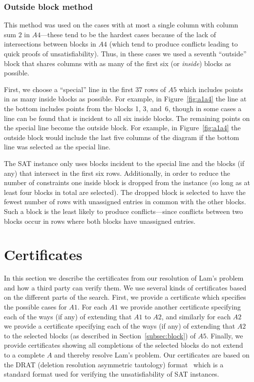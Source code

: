 \documentclass[letterpaper]{article}
\begin{document}
\subsubsection{Outside block method}

This method was used on the cases with at most a single
column with column sum $2$ in $A4$---these tend to be the hardest cases
because of the lack of intersections between blocks in $A4$ (which
tend to produce conflicts leading to quick proofs of unsatisfiability).
Thus, in these cases we used a seventh ``outside''
block that shares columns with as many of the first six (or \emph{inside}) blocks as possible.

First, we choose a ``special'' line in the first 37 rows of $A5$ which includes points
in as many inside blocks as possible.  For example, in Figure~\ref{fig:a1a4}
the line at the bottom includes points from the blocks 1, 3, and~6,
though in some cases a line can be found that is incident to all six inside blocks.
The remaining points on the special line become the outside block.
For example, in Figure~\ref{fig:a1a4} the outside block
would include the last five columns of the diagram
if the bottom line was selected as the special line.

The SAT instance only uses blocks incident to the special line
and the blocks (if any) that intersect in the first six rows.
Additionally, in order to reduce the number of constraints one inside
block is dropped from the instance (so long as
at least four blocks in total are selected).  The dropped block
is selected to have the fewest number of rows
with unassigned entries in common with the other blocks.  Such a 
block is the least likely to produce conflicts---since conflicts
between two blocks occur in rows where both blocks have unassigned
entries.

\section{Certificates}\label{sec:certificates}

In this section we describe the certificates from our resolution of Lam's problem
and how a third party can verify them.  We use several kinds of certificates
based on the different parts of the search.  First, we provide a certificate which specifies
the possible cases for $A1$.  For each $A1$ we provide another
certificate specifying each of the ways (if any) of extending that $A1$ to $A2$,
and similarly for each $A2$ we provide a certificate specifying each of the ways (if any)
of extending that $A2$ to the selected blocks
(as described in Section~\ref{subsec:block}) of $A5$.  Finally, we provide certificates
showing all completions of the selected blocks do not extend to a complete $A$
and thereby resolve Lam's problem.
Our certificates are based on the DRAT (deletion
resolution asymmetric tautology) format~\cite{wetzler2014drat}
which is a standard format used for verifying the unsatisfiability of SAT instances.
\end{document}

